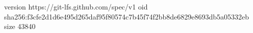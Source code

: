 version https://git-lfs.github.com/spec/v1
oid sha256:f3cfe2d1d6e495d265daf95f80574c7b45f74f2bb8de6829e8693db5a05332eb
size 43840
